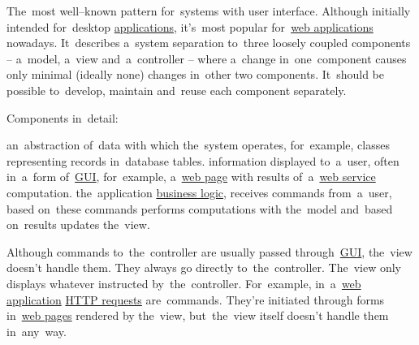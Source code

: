 \label{mvc}
The~most well--known pattern for~systems with user interface.
Although initially intended for~desktop \hyperref[applicationprocessprogramservicethread]{applications}, it's~most popular for~\hyperref[webserviceapplication]{web applications} nowadays.
It~describes a~system separation to~three loosely coupled components -- a~model, a~view and~a~controller -- where a~change in~one~component causes only minimal (ideally none) changes in~other two components.
It~should be possible to~develop, maintain and~reuse each component separately.
\newline

\noindent Components in~detail:
\begin{itemize}
     an~abstraction of~data with which the~system operates, for~example, classes representing records in~database tables.
     information displayed to~a~user, often in~a~form of~\hyperref[shellcligui]{GUI}, for~example, a~\hyperref[internetweb]{web page} with results of~a~\hyperref[webserviceapplication]{web service} computation.
     the~application \hyperref[businesslogic]{business logic}, receives commands from~a~user, based on~these commands performs computations with the~model and~based on~results updates the~view.
\end{itemize}

\note Although commands to~the~controller are usually passed through~\hyperref[shellcligui]{GUI}, the~view doesn't handle them.
They always go directly to~the~controller.
The~view only displays whatever instructed by~the~controller.
For~example, in~a~\hyperref[webserviceapplication]{web application} \hyperref[http]{HTTP requests} are~commands.
They're initiated through forms in~\hyperref[internetweb]{web pages} rendered by the~view, but~the~view itself doesn't handle them in~any~way.
\newpage

